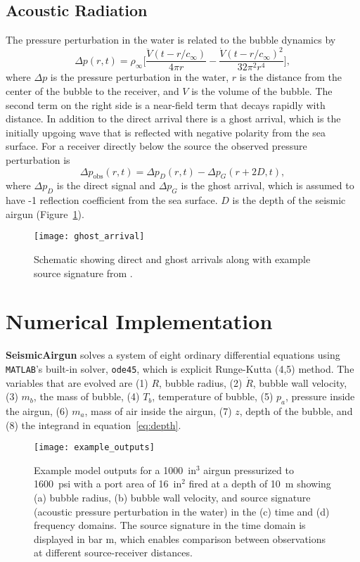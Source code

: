 \documentclass[10pt]{article}
\begin{document}
\subsection{Acoustic Radiation}
The pressure perturbation in the water is related to the bubble dynamics by \citep{Keller1956}
\begin{equation}
\Delta p(r,t) = \rho_\infty \bigg[ \frac{\ddot{V}(t-r/c_\infty)}{4\pi r} - \frac{\dot{V}(t-r/c_\infty)^2}{32\pi^2r^4} \bigg],
\label{eq:acoustic radiation}
\end{equation}
where $\Delta p$ is the pressure perturbation in the water, $r$ is the distance from the center of the bubble to the receiver, and $V$ is the volume of the bubble. The second term on the right side is a near-field term that decays rapidly with distance. In addition to the direct arrival there is a ghost arrival, which is the initially upgoing wave that is reflected with negative polarity from the sea surface. For a receiver directly below the source the observed pressure perturbation is
\begin{equation}
\Delta p_\text{obs}(r,t) = \Delta p_D(r,t) - \Delta p_G(r+2D,t),
\end{equation}
where $\Delta p_D$ is the direct signal and $\Delta p_G$ is the ghost arrival, which is assumed to have -1 reflection coefficient from the sea surface. $D$ is the depth of the seismic airgun (Figure~\ref{fig:ghost}).

\begin{figure}[h!]
\centering
\texttt{[image: ghost\_arrival]}
\caption{Schematic showing direct and ghost arrivals along with example source signature from \citet{Watson2016}.}
\label{fig:ghost}
\end{figure}

\newpage
\section{Numerical Implementation}
{\bf SeismicAirgun} solves a system of eight ordinary differential equations using \texttt{MATLAB}'s built-in solver, \texttt{ode45}, which is explicit Runge-Kutta (4,5) method. The variables that are evolved are (1) $R$, bubble radius, (2) $\dot{R}$, bubble wall velocity, (3) $m_b$, the mass of bubble, (4) $T_b$, temperature of bubble, (5) $p_a$, pressure inside the airgun, (6) $m_a$, mass of air inside the airgun, (7) $z$, depth of the bubble, and (8) the integrand in equation~\ref{eq:depth}.

\begin{figure}[t!]
\centering
\texttt{[image: example\_outputs]}
\caption{Example model outputs for a 1000~in$^3$ airgun pressurized to 1600~psi with a port area of 16~in$^2$ fired at a depth of 10~m showing (a) bubble radius, (b) bubble wall velocity, and source signature (acoustic pressure perturbation in the water) in the (c) time and (d) frequency domains. The source signature in the time domain is displayed in bar m, which enables comparison between observations at different source-receiver distances.}
\label{fig:example outputs}
\end{figure}
\end{document}
